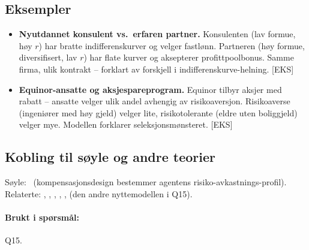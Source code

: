 \subsection*{Eksempler}
\begin{itemize}\setlength{\itemsep}{2pt}
\item \textbf{Nyutdannet konsulent vs.\ erfaren partner.} Konsulenten (lav formue, høy $r$) har bratte indifferenskurver og velger fastlønn. Partneren (høy formue, diversifisert, lav $r$) har flate kurver og aksepterer profittpoolbonus. Samme firma, ulik kontrakt -- forklart av forskjell i indifferenskurve-helning. [EKS]
\item \textbf{Equinor-ansatte og aksjespareprogram.} Equinor tilbyr aksjer med rabatt -- ansatte velger ulik andel avhengig av risikoaversjon. Risikoaverse (ingeniører med høy gjeld) velger lite, risikotolerante (eldre uten boliggjeld) velger mye. Modellen forklarer seleksjonsmønsteret. [EKS]
\end{itemize}

\subsection*{Kobling til søyle og andre teorier}
Søyle: \SThree\ (kompensasjonsdesign bestemmer agentens risiko-avkastnings-profil). Relaterte: , , , , ,  (den andre nyttemodellen i Q15).

\paragraph{Brukt i spørsmål:} Q15.
